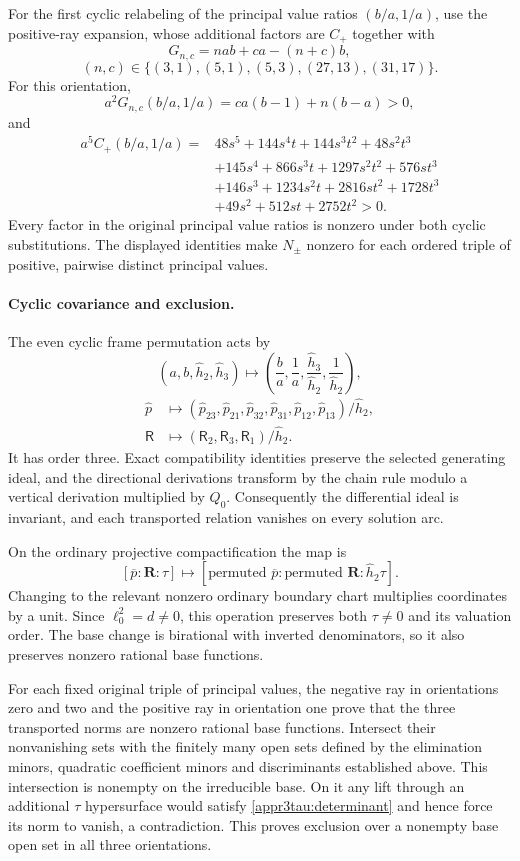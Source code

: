 \documentclass[11pt,a4paper]{article}
\numberwithin{equation}{section}
\theoremstyle{plain}
\theoremstyle{definition}
\theoremstyle{remark}
\begin{document}
For the first cyclic relabeling of the principal value ratios $(b/a,1/a)$,
use the positive-ray expansion, whose additional factors are $C_+$ together with
\[
 G_{n,c}=nab+ca-(n+c)b,
\]
\[
 (n,c)\in\{(3,1),(5,1),(5,3),(27,13),(31,17)\}.
\]
For this orientation,
\[
 a^2G_{n,c}(b/a,1/a)=ca(b-1)+n(b-a)>0,
\]
and
\begin{align*}
 a^5C_+(b/a,1/a)={}&48s^5+144s^4t+144s^3t^2+48s^2t^3\\
 &+145s^4+866s^3t+1297s^2t^2+576st^3\\
 &+146s^3+1234s^2t+2816st^2+1728t^3\\
 &+49s^2+512st+2752t^2>0.
\end{align*}
Every factor in the original principal value ratios is nonzero under both cyclic substitutions.
The displayed identities make $N_\pm$ nonzero for each ordered
triple of positive, pairwise distinct principal values.

\paragraph{Cyclic covariance and exclusion.}
The even cyclic frame permutation acts by
\[
 (a,b,\widehat h_2 ,\widehat h_3 )\longmapsto
 \left(\frac ba,\frac1a,\frac{\widehat h_3}{\widehat h_2},\frac{1}{\widehat h_2}\right),
\]
\[
 \begin{aligned}
 \widehat p&\longmapsto
   (\widehat p_{23},\widehat p_{21},\widehat p_{32},\widehat p_{31},\widehat p_{12},\widehat p_{13})/\widehat h_2 ,\\
 \mathsf R&\longmapsto(\mathsf R_2,\mathsf R_3,\mathsf R_1)/\widehat h_2 .
 \end{aligned}
\]
It has order three.  Exact compatibility identities preserve the selected
generating ideal, and the directional derivations transform by the
chain rule modulo a vertical derivation multiplied by $Q_0$.
Consequently the differential ideal is invariant, and each
transported relation vanishes on every solution arc.

On the ordinary projective compactification the map is
\[
 [\overline p:\boldsymbol R:\tau]\longmapsto
   [\text{permuted }\overline p:\text{permuted }\boldsymbol R:\widehat h_2 \tau].
\]
Changing to the relevant nonzero ordinary boundary chart multiplies coordinates
by a unit.  Since $\ell_0^2=d\ne0$, this operation preserves both
$\tau\ne0$ and its valuation order.  The base change is birational
with inverted denominators, so it also preserves nonzero rational
base functions.

For each fixed original triple of principal values, the negative ray in orientations
zero and two and the positive ray in orientation one prove that the
three transported norms are nonzero rational base functions.
Intersect their nonvanishing sets with the finitely many open sets defined by the elimination minors,
quadratic coefficient minors and discriminants established above.  This
intersection is nonempty on the irreducible base.  On it any lift
through an additional $\tau$ hypersurface would satisfy
\eqref{appr3tau:determinant} and hence force its norm to vanish, a
contradiction.  This proves exclusion over a nonempty base open set in
all three orientations.
\end{document}
